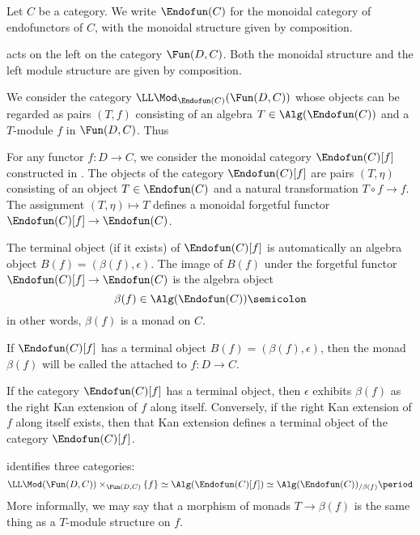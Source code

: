 \begin{construction}
	Let $ C $ be a category.
	We write $ \Endofun(C) $ for
	the monoidal category of endofunctors of $ C $,
	with the monoidal structure given by composition.

	acts on the left on the category $ \Fun(D, C) $.
	Both the monoidal structure and
	the left module structure
	are given by composition.

	We consider the category $ \LL\Mod_{\Endofun(C)}(\Fun(D,C)) $
	whose objects can be regarded as pairs $ (T, f ) $
	consisting of an algebra $ T \in \Alg(\Endofun(C)) $
	and a $ T $-module $ f $ in $ \Fun(D,C) $.
	Thus 

	For any functor $ f \colon D \to C $,
	we consider the monoidal category $ \Endofun(C)[f] $
	constructed in
	\cite[Definition 4.7.1.1]{Lurie2017}.
	The objects of the category $ \Endofun(C)[f] $
	are pairs $ (T, \eta) $ consisting of
	an object $ T \in \Endofun(C) $
	and a natural transformation $ T \circ f \to f $.
	The assignment $ (T, \eta) \mapsto T $ defines a 
	monoidal forgetful functor
	$ \Endofun(C)[f] \to \Endofun(C) $.

	The terminal object
	(if it exists)
	of $ \Endofun(C)[f] $ is automatically
	an algebra object $ B(f) = (\beta(f), \epsilon)$.
	The image of $ B(f) $ under
	the forgetful functor $ \Endofun(C)[f] \to \Endofun(C) $ is
	the algebra object
	\[
		\beta(f) \in \Alg(\Endofun(C)) \semicolon
	\]
	in other words, $ \beta(f) $ is a monad on $ C $.
	
	If $ \Endofun(C)[f] $ has
	a terminal object $ B(f) = (\beta(f), \epsilon)$,
	then the monad $ \beta(f) $ will be called the
	attached to $ f \colon D \to C $.

	If the category $ \Endofun(C)[f] $ has a terminal object,
	then $ \epsilon $ exhibits
	$ \beta(f) $ as the right Kan extension of $ f $
	along itself.
	Conversely, if the right Kan extension
	of $ f $ along itself exists,
	then that Kan extension defines a terminal object of
	the category $ \Endofun(C)[f] $.

	\cite[\S\S 4.7.1]{Lurie2017} identifies three categories:
	\[
		\LL\Mod(\Fun(D,C)) \times_{\Fun(D,C)} \left\{f\right\} \simeq
		\Alg(\Endofun(C)[f]) \simeq
		\Alg(\Endofun(C))_{/\beta(f)} \period
	\]
	More informally, we may say that
	a morphism of monads $ T \to \beta(f) $
	is the same thing as a $ T $-module structure on $ f $.
\end{construction}



